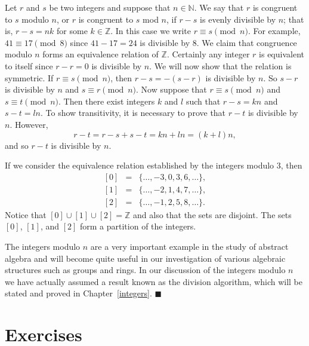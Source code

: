 \medskip
 
Let $r$ and $s$ be two integers and suppose that $n \in {\mathbb N}$.  We say that $r$ is {\bfi congruent to $s$ \bfi modulo} $n$, or $r$ is {\bfi congruent to $s$ \bfi mod} $n$, if $r - s$ is evenly divisible by $n$; that is, $r - s = nk$  for some $k \in {\mathbb Z}$.  In this case we write $r \equiv s \pmod{n}$\label{amodb}.  For example, \mbox{$41 \equiv 17 \pmod{ 8}$} since $41 - 17=24$ is divisible by 8.  We claim that congruence modulo $n$ forms an equivalence relation of ${\mathbb Z}$.  Certainly any integer $r$ is equivalent to itself since $r - r = 0$ is divisible by $n$.  We will now show that the relation is symmetric.  If $r \equiv s \pmod{ n}$, then $r - s = -(s -r)$ is divisible by $n$. So $s - r$ is divisible by $n$ and $s \equiv r \pmod{ n}$.  Now suppose that $r \equiv s \pmod{ n}$ and $s \equiv t \pmod{ n}$.  Then there exist integers $k$ and $l$ such that $r -s = kn$ and $s - t = ln$.  To show transitivity, it is necessary to prove that $r - t$ is divisible by $n$.  However,   
$$
r - t = r - s + s - t = kn + ln = (k + l)n,
$$
and so $r - t$ is divisible by $n$.
 
 
If we consider the equivalence relation established by the integers modulo 3, then 
\begin{eqnarray*}
{[0]} & = & \{ \ldots, -3, 0, 3, 6, \ldots \}, \\
{[1]} & = & \{ \ldots, -2, 1, 4, 7, \ldots \}, \\
{[2]} & = & \{ \ldots, -1, 2, 5, 8, \ldots \}.
\end{eqnarray*}
Notice that $[0] \cup [1] \cup [2] = {\mathbb Z}$ and also that the sets are disjoint.  The sets $[0]$, $[1]$, and $[2]$ form a partition of the integers. 

The integers modulo $n$ are a very important example in the study of abstract algebra and will become quite useful in our investigation of various algebraic structures such as groups and rings.  In our discussion of the integers modulo $n$ we have actually assumed a result known as the division algorithm, which will be stated and proved in Chapter~\ref{integers}.
\hspace{\fill} $\blacksquare$

 
\section*{Exercises}
\exrule
 
